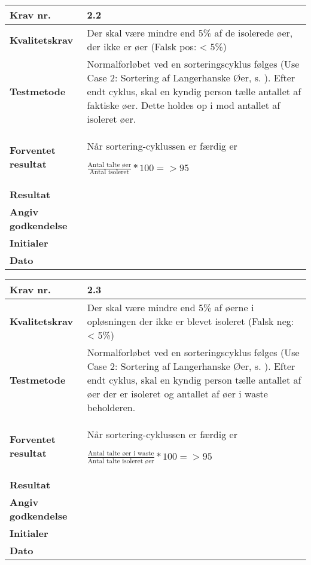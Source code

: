 \newpage

 	\begin{center}
		\begin{longtable}{ | m{4cm}| m{8.5cm}|} 
			\hline
			\textbf{Krav nr.} & 2.2 \\ 
			\hline
			\textbf{Kvalitetskrav} & Der skal være mindre end 5\% af de isolerede øer, der ikke er øer
(Falsk pos: < 5\%) \\
			\hline
			\textbf{Testmetode} & Normalforløbet ved en sorteringscyklus følges (Use Case 2: Sortering af Langerhanske Øer, s.  \pageref{uc:2}). Efter endt cyklus, skal en kyndig person tælle antallet af faktiske øer. Dette holdes op i mod antallet af isoleret øer.  \\
			\hline
			\textbf{Forventet resultat}  & Når sortering-cyklussen er færdig er

$\frac{\text{Antal talte øer}}{\text{Antal isoleret}}*100=>95$  \\
			\hline
			\textbf{Resultat}  &    \\
			\hline
			\textbf{Angiv godkendelse} &     \\
			\hline
			\textbf{Initialer} &     \\
			\hline
			\textbf{Dato} &    \\
			\hline
		\end{longtable}
	\end{center}	
			
 	\begin{center}
		\begin{longtable}{ | m{4cm}| m{8.5cm}|} 
			\hline
			\textbf{Krav nr.} & 2.3 \\ 
			\hline
			\textbf{Kvalitetskrav} & Der skal være mindre end 5\% af øerne i opløsningen der ikke er blevet isoleret
(Falsk neg: < 5\%) \\
			\hline
			\textbf{Testmetode} & Normalforløbet ved en sorteringscyklus følges (Use Case 2: Sortering af Langerhanske Øer, s.  \pageref{uc:2}). Efter endt cyklus, skal en kyndig person tælle antallet af øer der er isoleret og antallet af øer i waste beholderen.  \\
			\hline
			\textbf{Forventet resultat}  & Når sortering-cyklussen er færdig er

$\frac{\text{Antal talte øer i waste}}{\text{Antal talte isoleret øer}}*100= >95$  \\
			\hline
			\textbf{Resultat}  &    \\
			\hline
			\textbf{Angiv godkendelse} &     \\
			\hline
			\textbf{Initialer} &     \\
			\hline
			\textbf{Dato} &    \\
			\hline
		\end{longtable}
	\end{center}		

